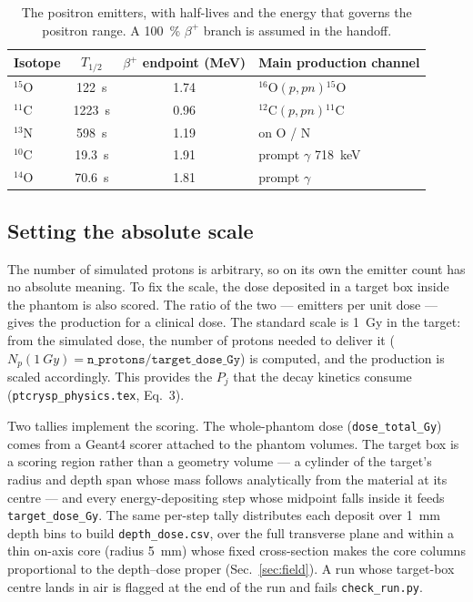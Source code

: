 \documentclass[11pt]{article}
\newcommand{\bplus}{\beta^{+}}
\newcommand{\Cl}[1]{{}^{#1}\mathrm{C}}
\newcommand{\Ox}[1]{{}^{#1}\mathrm{O}}
\newcommand{\Nt}[1]{{}^{#1}\mathrm{N}}
\newcommand{\file}[1]{\texttt{#1}}
\begin{document}
\begin{table}[h]
\centering
\caption{The positron emitters, with half-lives and the energy that governs the
positron range. A \SI{100}{\percent} $\bplus$ branch is assumed in the handoff.}
\label{tab:iso}
\begin{tabular}{lccl}
\toprule
Isotope & $T_{1/2}$ & $\bplus$ endpoint (MeV) & Main production channel \\
\midrule
$\Ox{15}$ & \SI{122}{s}   & 1.74 & $\Ox{16}(p,pn)\Ox{15}$ \\
$\Cl{11}$ & \SI{1223}{s}  & 0.96 & $\Cl{12}(p,pn)\Cl{11}$ \\
$\Nt{13}$ & \SI{598}{s}   & 1.19 & on O / N \\
$\Cl{10}$ & \SI{19.3}{s}  & 1.91 & prompt $\gamma$ \SI{718}{keV} \\
$\Ox{14}$ & \SI{70.6}{s}  & 1.81 & prompt $\gamma$ \\
\bottomrule
\end{tabular}
\end{table}

\subsection{Setting the absolute scale}
\label{sec:scale}
The number of simulated protons is arbitrary, so on its own the emitter count has
no absolute meaning. To fix the scale, the dose deposited in a target box inside
the phantom is also scored. The ratio of the two --- emitters per unit dose ---
gives the production for a clinical dose. The standard scale is \SI{1}{Gy} in the
target: from the simulated dose, the number of protons needed to deliver it
($N_p(\SI{1}{Gy})=\file{n\_protons}/\file{target\_dose\_Gy}$) is computed, and the
production is scaled accordingly. This provides the $P_j$ that the decay kinetics
consume (\file{ptcrysp\_physics.tex}, Eq.~3).

Two tallies implement the scoring. The whole-phantom dose
(\file{dose\_total\_Gy}) comes from a Geant4 scorer attached to the phantom
volumes. The target box is a scoring region rather than a geometry volume --- a
cylinder of the target's radius and depth span whose mass follows analytically
from the material at its centre --- and every energy-depositing step whose
midpoint falls inside it feeds \file{target\_dose\_Gy}. The same per-step tally
distributes each deposit over \SI{1}{mm} depth bins to build
\file{depth\_dose.csv}, over the full transverse plane and within a thin
on-axis core (radius \SI{5}{mm}) whose fixed cross-section makes the core
columns proportional to the depth--dose proper (Sec.~\ref{sec:field}). A run
whose target-box centre lands in air is flagged at the end of the run and
fails \file{check\_run.py}.
\end{document}
